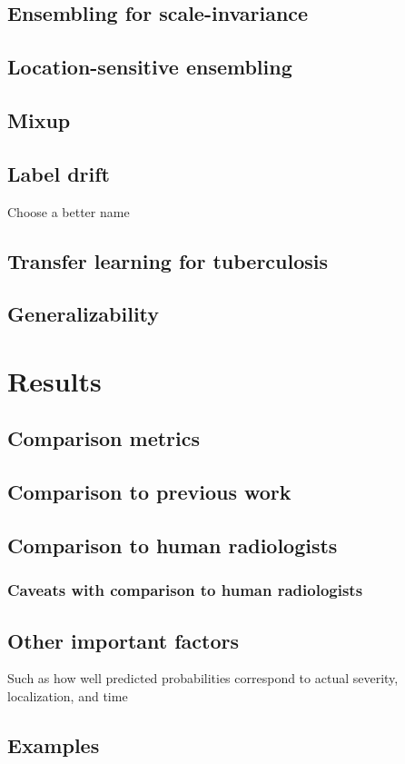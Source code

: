 \documentclass[11pt,twoside,a4paper]{report}
\begin{document}
    \section{Ensembling for scale-invariance}
    \section{Location-sensitive ensembling}
    \section{Mixup}
    \section{Label drift}
    Choose a better name
    \section{Transfer learning for tuberculosis}
    \section{Generalizability}
\chapter{Results}
    \section{Comparison metrics}
    \section{Comparison to previous work}
    \section{Comparison to human radiologists}
        \subsection{Caveats with comparison to human radiologists}
    \section{Other important factors}
    Such as how well predicted probabilities correspond to actual severity, localization, and time
    \section{Examples}
\end{document}
